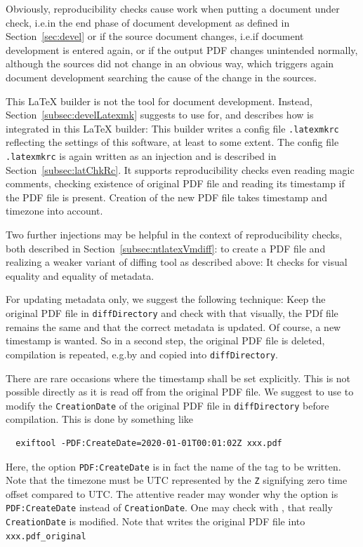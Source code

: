 Obviously, reproducibility checks cause work 
when putting a document under check, 
i.e.\@ in the end phase of document development 
as defined in Section~\ref{sec:devel}
or if the source document changes, i.e.\@ if document development is entered again, 
or if the output PDF changes unintended 
normally, although the sources did not change in an obvious way, 
which triggers again document development searching the cause of the change in the sources. 

This \LaTeX{} builder is not the tool for document development. 
Instead, Section~\ref{subsec:develLatexmk} suggests to use  for, 
and describes how  is integrated in this \LaTeX{} builder: 
This builder writes a config file \texttt{.latexmkrc} 
reflecting the settings of this software, at least to some extent. 
The config file \texttt{.latexmkrc} is again written as an injection 
and is described in Section~\ref{subsec:latChkRc}. 
It supports reproducibility checks even reading magic comments, 
checking existence of original PDF file 
and reading its timestamp if the PDF file is present. 
Creation of the new PDF file takes timestamp and timezone into account. 

Two further injections may be helpful in the context of reproducibility checks, 
both described in Section~\ref{subsec:ntlatexVmdiff}: 
 to create a PDF file and  
realizing a weaker variant of diffing tool as described above: 
It checks for visual equality and equality of metadata. 
\medskip


For updating metadata only, we suggest the following technique: 
Keep the original PDF file in \texttt{diffDirectory} 
and check with  that visually, the PDf file remains the same 
and that the correct metadata is updated. 
Of course, a new timestamp is wanted. 
So in a second step, the original PDF file is deleted, 
compilation is repeated, e.g.\@ by  and copied into \texttt{diffDirectory}. 
\medskip


There are rare occasions where the timestamp shall be set explicitly. 
This is not possible directly as it is read off from the original PDF file. 
We suggest to use  to modify the \texttt{CreationDate} 
of the original PDF file in \texttt{diffDirectory} before compilation. 
This is done by something like
%
\begin{verbatim}
  exiftool -PDF:CreateDate=2020-01-01T00:01:02Z xxx.pdf 
\end{verbatim}
%
Here, the option \texttt{PDF:CreateDate} is in fact the name of the tag to be written. 
Note that the timezone must be UTC represented by the \texttt Z 
signifying zero time offset compared to UTC\@. 
The attentive reader may wonder why the option is \texttt{PDF:CreateDate} instead of \texttt{CreationDate}. 
One may check with , that really \texttt{CreationDate} is modified. 
Note that  writes the original PDF file into \texttt{xxx.pdf\_original}


